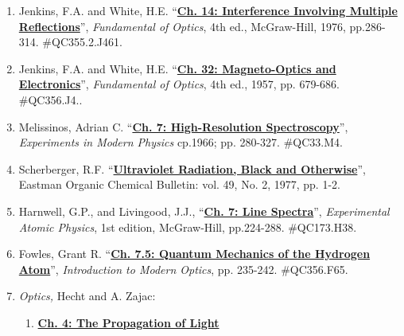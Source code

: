 \documentclass{../lab}
\begin{document}
\begin{enumerate}
\begin{enumerate}
        \item \href{https://drive.google.com/file/d/1ZxrbR-Ld5PE0Edlv2-UBb6UQ2N20lv1t/view?usp=drive_link}{\textbf{Ch. 18: Hyperfine Structure}}
        
    \end{enumerate}

    \item Jenkins, F.A. and White, H.E. ``\href{https://drive.google.com/file/d/1Kpwo43i4IxsZ4OV892dzlt4fYZJZx77K/view?usp=drive_link}{\textbf{Ch. 14: Interference Involving Multiple Reflections}}'', \emph{Fundamental of Optics}, 4th ed., McGraw-Hill, 1976, pp.286-314. \#QC355.2.J461.

    \item Jenkins, F.A. and White, H.E. ``\href{https://drive.google.com/file/d/1SHMK3iZRn-N6w-YdiYpmMzGsXXRNR7y-/view?usp=drive_link}{\textbf{Ch. 32: Magneto-Optics and Electronics}}'', \emph{Fundamental of Optics}, 4th ed., 1957, pp. 679-686. \#QC356.J4..
    
    \item Melissinos, Adrian C. ``\href{https://drive.google.com/file/d/1brBycdMe_WVPmTLmFWHqJ-sOkFWtqQi0/view?usp=drive_link}{\textbf{Ch. 7: High-Resolution Spectroscopy}}'', \emph{Experiments in Modern Physics} cp.1966; pp. 280-327. \#QC33.M4.
    \label{ref:melissinos}
    
    \item Scherberger, R.F. ``\href{https://drive.google.com/file/d/1NT0O6jWrlHuwrbpy-OzeJZJRdu2nizNj/view?usp=drive_link}{\textbf{Ultraviolet Radiation, Black and Otherwise}}'', Eastman Organic Chemical Bulletin: vol. 49, No. 2, 1977, pp. 1-2.
    
    \item Harnwell, G.P., and Livingood, J.J., ``\href{https://drive.google.com/file/d/1kVe84n33iZhqeYtp2O9v_Uqie1AxE_i6/view?usp=drive_link}{\textbf{Ch. 7: Line Spectra}}'', \emph{Experimental Atomic Physics}, 1st edition, McGraw-Hill, pp.224-288. \#QC173.H38.
    
    \item Fowles, Grant R. ``\href{https://drive.google.com/file/d/1PwgPLVca2DgxSQLqtZGBIcFBNWKwY7PY/view?usp=drive_link}{\textbf{Ch. 7.5: Quantum Mechanics of the Hydrogen Atom}}'', \emph{Introduction to Modern Optics}, pp. 235-242. \#QC356.F65.
    
    \item \emph{Optics,} Hecht and A. Zajac:
    \begin{enumerate}
        \item \href{https://drive.google.com/file/d/1QfpFUCRGliLOCFQdJsFTPQEIYg4wVREf/view?usp=drive_link}{\textbf{Ch. 4: The Propagation of Light}}
        

\end{enumerate}
\end{enumerate}
\end{document}
